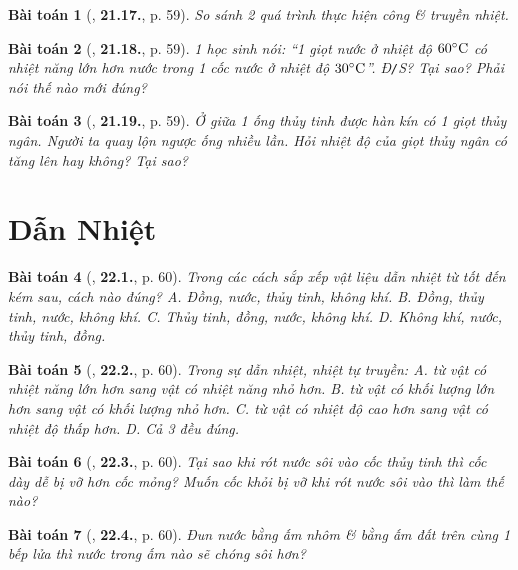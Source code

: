 \documentclass{article}
\numberwithin{equation}{section}
\newtheorem{baitoan}{Bài toán}
\begin{document}
\begin{baitoan}[\cite{SBT_Vat_Ly_8}, \textbf{21.17.}, p. 59]
	So sánh 2 quá trình thực hiện công \& truyền nhiệt.
\end{baitoan}

\begin{baitoan}[\cite{SBT_Vat_Ly_8}, \textbf{21.18.}, p. 59]
	1 học sinh nói: ``1 giọt nước ở nhiệt độ $60^\circ{\rm C}$ có nhiệt năng lớn hơn nước trong 1 cốc nước ở nhiệt độ $30^\circ{\rm C}$''. \emph{Đ\texttt{/}S?} Tại sao? Phải nói thế nào mới đúng?
\end{baitoan}

\begin{baitoan}[\cite{SBT_Vat_Ly_8}, \textbf{21.19.}, p. 59]
	Ở giữa 1 ống thủy tinh được hàn kín có 1 giọt thủy ngân. Người ta quay lộn ngược ống nhiều lần. Hỏi nhiệt độ của giọt thủy ngân có tăng lên hay không? Tại sao?
\end{baitoan}


\section{Dẫn Nhiệt}

\begin{baitoan}[\cite{SBT_Vat_Ly_8}, \textbf{22.1.}, p. 60]
	Trong các cách sắp xếp vật liệu dẫn nhiệt từ tốt đến kém sau, cách nào đúng? {\sf A.} Đồng, nước, thủy tinh, không khí. {\sf B.} Đồng, thủy tinh, nước, không khí. {\sf C.} Thủy tinh, đồng, nước, không khí. {\sf D.} Không khí, nước, thủy tinh, đồng.
\end{baitoan}

\begin{baitoan}[\cite{SBT_Vat_Ly_8}, \textbf{22.2.}, p. 60]
	Trong sự dẫn nhiệt, nhiệt tự truyền: {\sf A.} từ vật có nhiệt năng lớn hơn sang vật có nhiệt năng nhỏ hơn. {\sf B.} từ vật có khối lượng lớn hơn sang vật có khối lượng nhỏ hơn. {\sf C.} từ vật có nhiệt độ cao hơn sang vật có nhiệt độ thấp hơn. {\sf D.} Cả 3 đều đúng.
\end{baitoan}

\begin{baitoan}[\cite{SBT_Vat_Ly_8}, \textbf{22.3.}, p. 60]
	Tại sao khi rót nước sôi vào cốc thủy tinh thì cốc dày dễ bị vỡ hơn cốc mỏng? Muốn cốc khỏi bị vỡ khi rót nước sôi vào thì làm thế nào?
\end{baitoan}

\begin{baitoan}[\cite{SBT_Vat_Ly_8}, \textbf{22.4.}, p. 60]
	Đun nước bằng ấm nhôm \& bằng ấm đất trên cùng 1 bếp lửa thì nước trong ấm nào sẽ chóng sôi hơn?
\end{baitoan}
\end{document}
